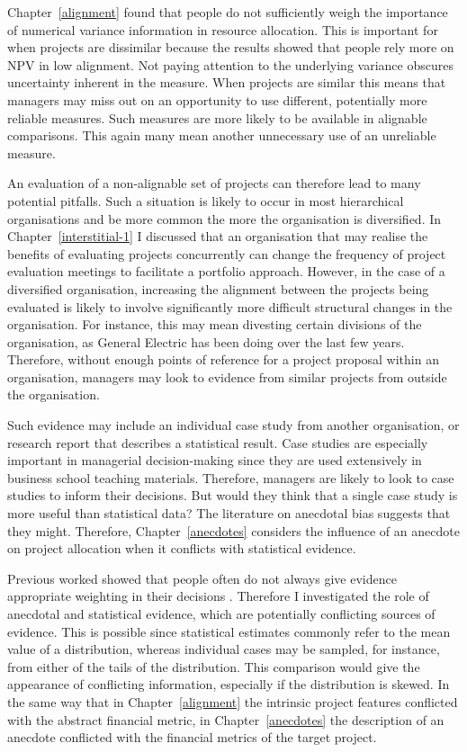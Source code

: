 \documentclass[a4paper, nobind, dvipsnames]{templates/ociamthesis}
\theoremstyle{definition}
\theoremstyle{definition}
\theoremstyle{definition}
\theoremstyle{definition}
\theoremstyle{remark}
\begin{document}
Chapter~\ref{alignment} found that people do not sufficiently weigh the
importance of numerical variance information in resource allocation. This is
important for when projects are dissimilar because the results showed that
people rely more on NPV in low alignment. Not paying attention to the underlying
variance obscures uncertainty inherent in the measure. When projects are similar
this means that managers may miss out on an opportunity to use different,
potentially more reliable measures. Such measures are more likely to be
available in alignable comparisons. This again many mean another unnecessary use
of an unreliable measure.

An evaluation of a non-alignable set of projects can therefore lead to many
potential pitfalls. Such a situation is likely to occur in most hierarchical
organisations and be more common the more the organisation is diversified. In
Chapter~\ref{interstitial-1} I discussed that an organisation that may realise
the benefits of evaluating projects concurrently can change the frequency of
project evaluation meetings to facilitate a portfolio approach. However, in the
case of a diversified organisation, increasing the alignment between the
projects being evaluated is likely to involve significantly more difficult
structural changes in the organisation. For instance, this may mean divesting
certain divisions of the organisation, as General Electric has been doing over
the last few years. Therefore, without enough points of reference for a project
proposal within an organisation, managers may look to evidence from similar
projects from outside the organisation.

Such evidence may include an individual case study from another organisation, or
research report that describes a statistical result. Case studies are especially
important in managerial decision-making since they are used extensively in
business school teaching materials. Therefore, managers are likely to look to
case studies to inform their decisions. But would they think that a single case
study is more useful than statistical data? The literature on anecdotal bias
suggests that they might. Therefore, Chapter~\ref{anecdotes} considers the
influence of an anecdote on project allocation when it conflicts with
statistical evidence.

Previous worked showed that people often do not always give evidence appropriate
weighting in their decisions \autocite{griffin1992}. Therefore I investigated the role
of anecdotal and statistical evidence, which are potentially conflicting sources
of evidence. This is possible since statistical estimates commonly refer to the
mean value of a distribution, whereas individual cases may be sampled, for
instance, from either of the tails of the distribution. This comparison would
give the appearance of conflicting information, especially if the distribution
is skewed. In the same way that in Chapter~\ref{alignment} the intrinsic
project features conflicted with the abstract financial metric, in
Chapter~\ref{anecdotes} the description of an anecdote conflicted with the
financial metrics of the target project.
\end{document}
